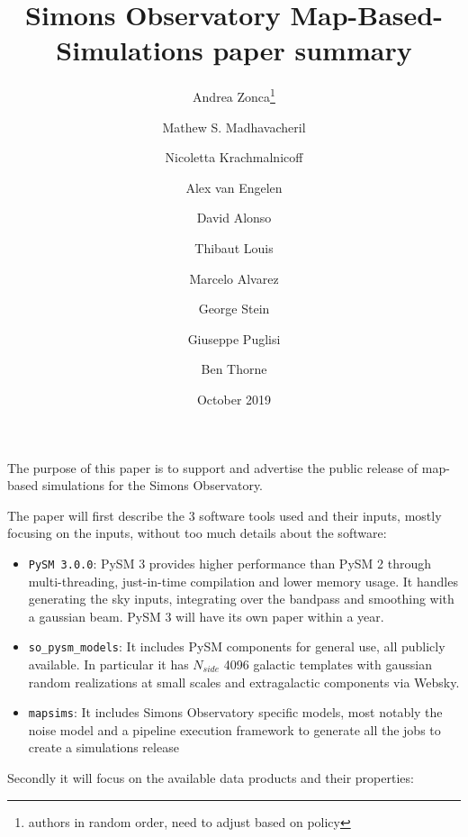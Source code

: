 \documentclass{article}
\title{Simons Observatory Map-Based-Simulations paper summary}
\author{Andrea Zonca\footnote{authors in random order, need to adjust based on policy} \and Mathew S. Madhavacheril \and Nicoletta Krachmalnicoff \and Alex van Engelen \and David Alonso \and Thibaut Louis \and Marcelo Alvarez \and George Stein \and Giuseppe Puglisi \and Ben Thorne}
\date{October 2019}
\begin{document}
\maketitle

The purpose of this paper is to support and advertise the public release of
map-based simulations for the Simons Observatory.

The paper will first describe the 3 software tools used and their inputs, mostly focusing on the inputs, without too much details about the software:
\begin{itemize}
    \item \texttt{PySM 3.0.0}: PySM 3 provides higher performance than PySM 2 through multi-threading, just-in-time compilation and lower memory usage. It handles generating the sky inputs, integrating over the bandpass and smoothing with a gaussian beam. PySM 3 will have its own paper within a year.
    \item \texttt{so\_pysm\_models}: It includes PySM components for general use, all publicly available. In particular it has $N_{side}$ 4096 galactic templates with gaussian random realizations at small scales and extragalactic components via Websky.
    \item \texttt{mapsims}: It includes Simons Observatory specific models, most notably the noise model and a pipeline execution framework to generate all the jobs to create a simulations release
\end{itemize}

Secondly it will focus on the available data products and their properties:
\end{document}
